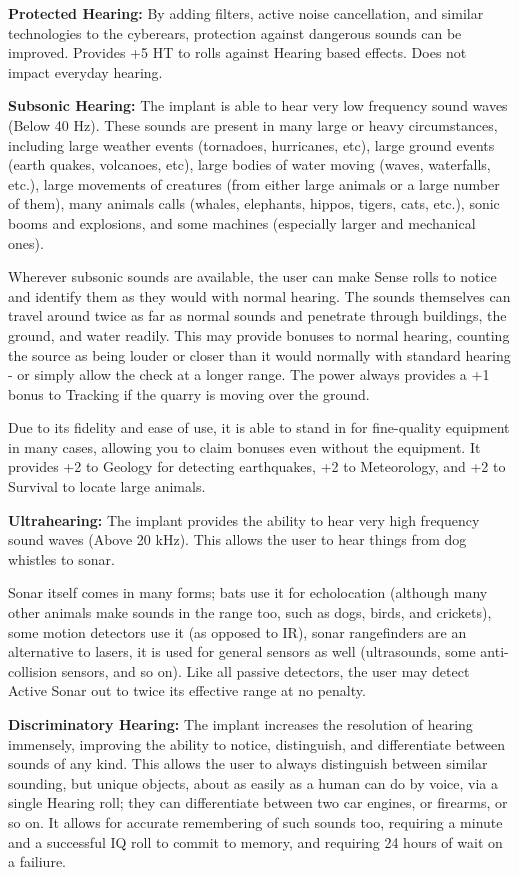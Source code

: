 \begin{multicols*}{3}
	\textbf{Protected Hearing:} By adding filters, active noise cancellation, and similar technologies to the cyberears, protection against dangerous sounds can be improved. Provides +5 HT to rolls against Hearing based effects. Does not impact everyday hearing.
	
	\textbf{Subsonic Hearing:} The implant is able to hear very	low frequency sound waves (Below 40	Hz). These sounds are present in many large or heavy circumstances, including large weather events (tornadoes, hurricanes, etc), large ground events (earth	quakes, volcanoes, etc), large bodies of water moving (waves, waterfalls, etc.), large movements of creatures (from either large animals or a large number of them), many animals calls (whales, elephants, hippos, tigers, cats, etc.), sonic
	booms and explosions, and some machines (especially larger and mechanical ones).
	
	Wherever subsonic sounds are available, the user can make Sense rolls to notice and identify them as they would with normal hearing. The sounds themselves can travel around twice as far as normal sounds and penetrate through buildings, the ground, and water readily. This may provide bonuses to normal hearing, counting the source as being louder or closer than it would normally with standard hearing - or simply allow the check at a longer range. The power always provides a +1 bonus to Tracking if the quarry is moving over the ground. 
	
	Due to its fidelity and ease of use, it is able to stand in for fine-quality equipment in many cases, allowing you to claim bonuses even without the equipment. It provides +2 to Geology for detecting earthquakes, +2 to Meteorology, and +2 to Survival to locate large animals.
	
	\textbf{Ultrahearing:} The implant provides the ability to hear very high frequency sound waves (Above 20 kHz). This allows the user to hear things from dog whistles to sonar. 
	
	Sonar itself comes in many forms; bats use it for echolocation (although many other animals make sounds in the range too, such as dogs, birds, and crickets), some motion detectors use it (as opposed to IR), sonar rangefinders are an alternative to lasers, it is used for general sensors as well (ultrasounds, some anti-collision sensors, and so on). Like all passive detectors, the user may detect Active Sonar out to twice its effective range at no penalty.
	
	\textbf{Discriminatory Hearing:} The implant increases the resolution of hearing immensely, improving the ability to notice, distinguish, and differentiate between sounds of any kind. This allows the user to always distinguish between similar sounding, but unique objects, about as easily as a human can do by voice, via a single Hearing roll; they can differentiate between two car engines, or firearms, or so on. It allows for accurate remembering of such sounds too, requiring a minute and a successful IQ roll to commit to memory, and requiring 24 hours of wait on a failiure.
	

\end{multicols*}
